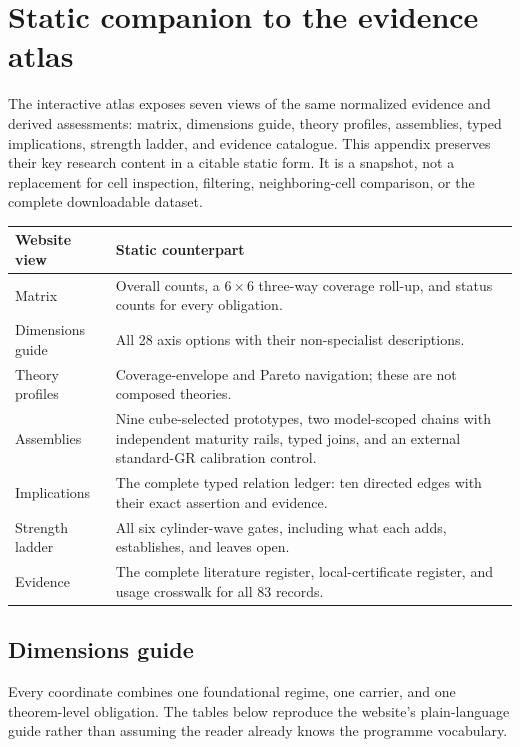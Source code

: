 \section{Static companion to the evidence atlas}
\label{app:atlas-companion}

The interactive atlas exposes seven views of the same normalized evidence and derived assessments: matrix, dimensions guide, theory profiles, assemblies, typed implications, strength ladder, and evidence catalogue.  This appendix preserves their key research content in a citable static form.  It is a snapshot, not a replacement for cell inspection, filtering, neighboring-cell comparison, or the complete downloadable dataset.

\begin{center}
\small
\begin{tabularx}{\textwidth}{@{}p{}Y@{}}
\toprule
Website view & Static counterpart \\
\midrule
Matrix & Overall counts, a \(6\times6\) three-way coverage roll-up, and status counts for every obligation. \\
Dimensions guide & All 28 axis options with their non-specialist descriptions. \\
Theory profiles & Coverage-envelope and Pareto navigation; these are not composed theories. \\
Assemblies & Nine cube-selected prototypes, two model-scoped chains with independent maturity rails, typed joins, and an external standard-GR calibration control. \\
Implications & The complete typed relation ledger: ten directed edges with their exact assertion and evidence. \\
Strength ladder & All six cylinder-wave gates, including what each adds, establishes, and leaves open. \\
Evidence & The complete literature register, local-certificate register, and usage crosswalk for all 83 records. \\
\bottomrule
\end{tabularx}
\end{center}

\subsection{Dimensions guide}
\label{app:dimensions-guide}
Every coordinate combines one foundational regime, one carrier, and one theorem-level obligation.  The tables below reproduce the website's plain-language guide rather than assuming the reader already knows the programme vocabulary.

